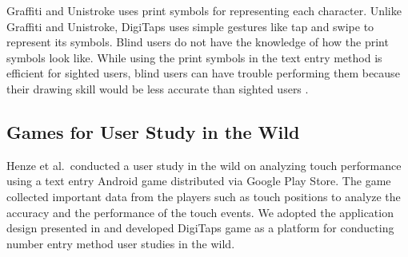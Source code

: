 Graffiti and Unistroke \cite{Goldberg:1993} uses print symbols for representing each character. Unlike Graffiti and Unistroke, DigiTaps uses simple gestures like tap and swipe to represent its symbols. Blind users do not have the knowledge of how the print symbols look like. While using the print symbols in the text entry method is efficient for sighted users, blind users can have trouble performing them because their drawing skill would be less accurate than sighted users \cite{Kane:2011}. 

\subsection{Games for User Study in the Wild}
Henze et al.\ conducted a user study in the wild on analyzing touch performance \cite{Henze:2011} using a text entry Android game distributed via Google Play Store. The game collected important data from the players such as touch positions to analyze the accuracy and the performance of the touch events. We adopted the application design presented in \cite{Henze:2012} and developed DigiTaps game as a platform for conducting number entry method user studies in the wild.